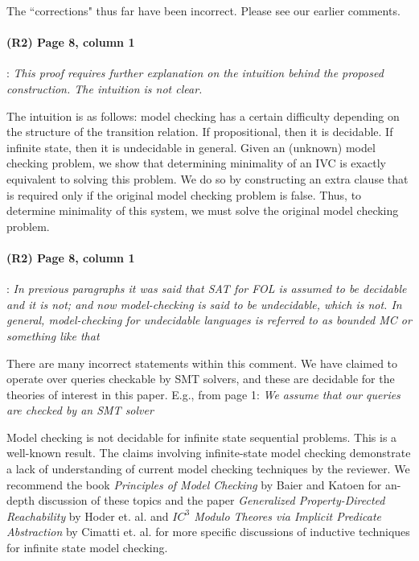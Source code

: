\documentclass{article}
\begin{document}
\noindent The ``corrections" thus far have been incorrect. Please see our earlier comments.

\paragraph{(R2) Page 8, column 1}: \textit{This proof requires further explanation on the
intuition behind the proposed construction. The intuition is not clear.}
\vspace{0.05in}

\noindent The intuition is as follows: model checking has a certain difficulty depending on the structure of the transition relation.  If propositional, then it is decidable. If infinite state, then it is undecidable in general.  Given an (unknown) model checking problem, we show that determining minimality of an IVC is exactly equivalent to solving this problem.  We do so by constructing an extra clause that is required only if the original model checking problem is false.  Thus, to determine minimality of this system, we must solve the original model checking problem.


\paragraph{(R2) Page 8, column 1}: \textit{In previous paragraphs it was said that SAT for FOL is assumed to be decidable and it is not; and now model-checking is said to be undecidable, which is not. In general, model-checking for undecidable languages is referred to as bounded MC or something like that}
\vspace{0.05in}

\noindent There are many incorrect statements within this comment.  We have claimed to operate over queries checkable by SMT solvers, and these are decidable for the theories of interest in this paper.  E.g., from page 1: \textit{We assume that our queries are checked by an SMT solver}

Model checking is not decidable for infinite state sequential problems.  This is a well-known result.  The claims involving infinite-state model checking demonstrate a lack of understanding of current model checking techniques by the reviewer.  We recommend the book {\em Principles of Model Checking} by Baier and Katoen for an-depth discussion of these topics and the paper {\em Generalized Property-Directed Reachability} by Hoder et. al.  and {\em $IC^{3}$ Modulo Theores via Implicit Predicate Abstraction} by Cimatti et. al. for more specific discussions of inductive techniques for infinite state model checking.
\end{document}
